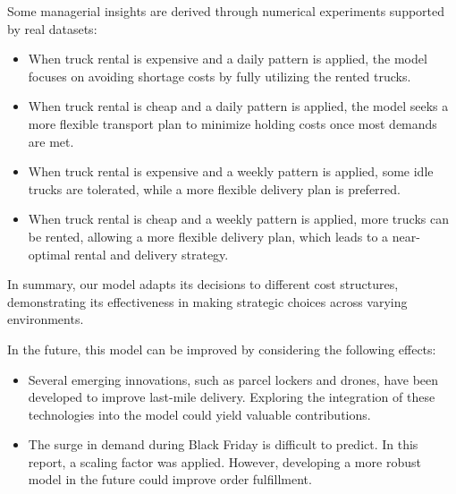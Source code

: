 \documentclass[a4paper,12pt]{article}
\begin{document}
Some managerial insights are derived through numerical experiments supported by real datasets:
\begin{itemize}
    \item When truck rental is expensive and a daily pattern is applied, the model focuses on avoiding shortage costs by fully utilizing the rented trucks.
    \item When truck rental is cheap and a daily pattern is applied, the model seeks a more flexible transport plan to minimize holding costs once most demands are met.
    \item When truck rental is expensive and a weekly pattern is applied, some idle trucks are tolerated, while a more flexible delivery plan is preferred.
    \item When truck rental is cheap and a weekly pattern is applied, more trucks can be rented, allowing a more flexible delivery plan, which leads to a near-optimal rental and delivery strategy.
\end{itemize}

In summary, our model adapts its decisions to different cost structures, demonstrating its effectiveness in making strategic choices across varying environments.

In the future, this model can be improved by considering the following effects:
\begin{itemize}
    \item Several emerging innovations, such as parcel lockers and drones, have been developed to improve last-mile delivery.
    Exploring the integration of these technologies into the model could yield valuable contributions.
    \item The surge in demand during Black Friday is difficult to predict.
    In this report, a scaling factor was applied.
    However, developing a more robust model in the future could improve order fulfillment.
\end{itemize}
\end{document}
